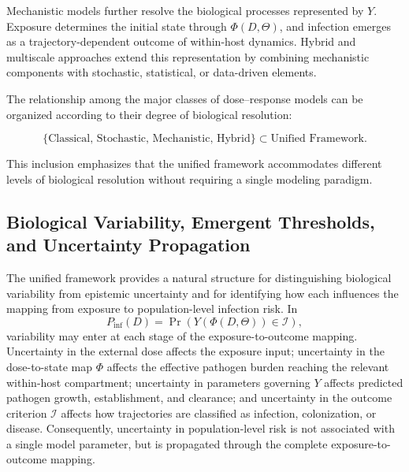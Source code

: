 \documentclass[11pt]{article}
\begin{document}
Mechanistic models further resolve the biological processes represented by $Y$. Exposure determines the initial state through $\Phi(D,\Theta)$, and infection emerges as a trajectory-dependent outcome of within-host dynamics. Hybrid and multiscale approaches extend this representation by combining mechanistic components with stochastic, statistical, or data-driven elements.


The relationship among the major classes of dose–response models can be organized according to their degree of biological resolution:

\[
\{\text{Classical, Stochastic, Mechanistic, Hybrid}\}
\subset \text{Unified Framework}.
\]

This inclusion emphasizes that the unified framework
accommodates different levels of biological resolution
without requiring a single modeling paradigm.


\subsection{Biological Variability, Emergent Thresholds, and Uncertainty Propagation}

The unified framework provides a natural structure for distinguishing
biological variability from epistemic uncertainty and for identifying how
each influences the mapping from exposure to population-level infection risk. In
\[
P_{\mathrm{inf}}(D)
=
\Pr\!\left(Y(\Phi(D,\Theta))\in\mathcal{I}\right),
\]
variability may enter at each stage of the exposure-to-outcome mapping.
Uncertainty in the external dose affects the exposure input; uncertainty
in the dose-to-state map $\Phi$ affects the effective pathogen burden
reaching the relevant within-host compartment; uncertainty in parameters
governing $Y$ affects predicted pathogen growth, establishment, and
clearance; and uncertainty in the outcome criterion $\mathcal{I}$ affects
how trajectories are classified as infection, colonization, or disease.
Consequently, uncertainty in population-level risk is not associated with
a single model parameter, but is propagated through the complete
exposure-to-outcome mapping.
\end{document}
